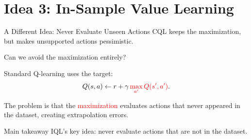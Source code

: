 \section{Idea 3: In-Sample Value Learning}

\begin{frame}{A Different Idea: Never Evaluate Unseen Actions}
  CQL keeps the maximization, but makes unsupported actions pessimistic.

  \vspace{0.25cm}
  Can we avoid the maximization entirely?

  \vspace{0.15cm}
  Standard Q-learning uses the target:
  \[
    Q(s,a)
    \leftarrow
    r+\gamma\,\textcolor{red}{\max_{a'} Q(s',a')}.
  \]

  \vspace{0.25cm}
  The problem is that the \textcolor{red}{maximization} evaluates actions that never appeared in the dataset, creating extrapolation errors.

  \vspace{0.25cm}
  \begin{block}{Main takeaway}
    IQL's key idea: never evaluate actions that are not in the dataset.
  \end{block}
\end{frame}

